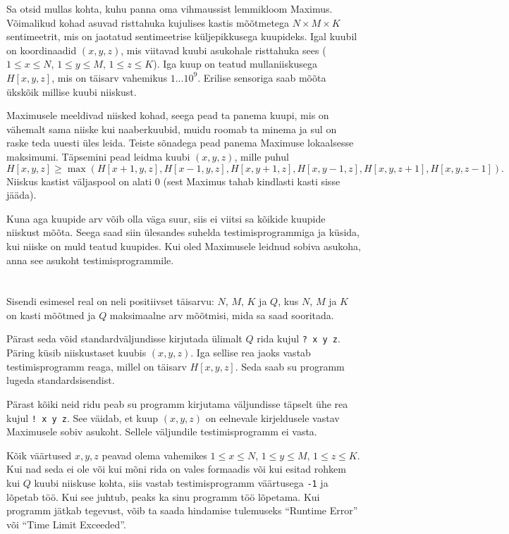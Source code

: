 \ifx\boi\undefined\fi
\def\version{jury-1}

Sa otsid mullas kohta, kuhu panna oma vihmaussist lemmikloom Maximus. 
Võimalikud kohad asuvad risttahuka kujulises kastis mõõtmetega $N \times M \times K$ sentimeetrit, 
mis on jaotatud sentimeetrise küljepikkusega kuupideks. Igal kuubil on koordinaadid $(x,y,z)$, 
mis viitavad kuubi asukohale risttahuka sees ($1 \le x \le N$, $1 \le y \le M$, $1 \le z \le K$). 
Iga kuup on teatud mullaniiskusega $H[x,y,z]$, mis on täisarv vahemikus $1 \dots 10^9$. 
Erilise sensoriga saab mõõta ükskõik millise kuubi niiskust.

Maximusele meeldivad niisked kohad, seega pead ta panema kuupi, mis on vähemalt sama niiske kui naaberkuubid, 
muidu roomab ta minema ja sul on raske teda uuesti üles leida.
Teiste sõnadega pead panema Maximuse lokaalsesse maksimumi.
Täpsemini pead leidma kuubi $(x,y,z)$, mille puhul
$$
H[x,y,z] \ge \max(H[x+1,y,z], H[x-1,y,z], H[x,y+1,z], H[x,y-1,z], H[x,y,z+1], H[x,y,z-1]).
$$
Niiskus kastist väljaspool on alati $0$ (sest Maximus tahab kindlasti kasti sisse jääda).

Kuna aga kuupide arv võib olla väga suur, siis ei viitsi sa kõikide kuupide niiskust mõõta. Seega saad siin ülesandes suhelda testimisprogrammiga ja küsida, kui niiske on muld teatud kuupides.
Kui oled Maximusele leidnud sobiva asukoha, anna see asukoht testimisprogrammile.

\section*{\interactivity}
Sisendi esimesel real on neli positiivset täisarvu: $N$, $M$, $K$ ja $Q$, kus $N$, $M$ ja $K$ on kasti mõõtmed ja $Q$ maksimaalne arv mõõtmisi, mida sa saad sooritada.

Pärast seda võid standardväljundisse kirjutada ülimalt $Q$ rida kujul \texttt{?\ x y z}.
Päring küsib niiskustaset kuubis $(x, y, z)$.
Iga sellise rea jaoks vastab testimisprogramm reaga, millel on täisarv $H[x,y,z]$. Seda saab su programm lugeda standardsisendist.

Pärast kõiki neid ridu peab su programm kirjutama väljundisse täpselt ühe rea kujul \texttt{!\ x y z}.
See väidab, et kuup $(x, y, z)$ on eelnevale kirjeldusele vastav Maximusele sobiv asukoht.
Sellele väljundile testimisprogramm ei vasta.

Kõik väärtused $x, y, z$ peavad olema vahemikes $1 \le x \le N$, $1 \le y \le M$, $1 \le z \le K$.
Kui nad seda ei ole või kui mõni rida on vales formaadis või kui esitad rohkem kui $Q$ kuubi niiskuse kohta,
siis vastab testimisprogramm väärtusega \texttt{-1} ja lõpetab töö.
Kui see juhtub, peaks ka sinu programm töö lõpetama. Kui programm jätkab tegevust, võib ta 
saada hindamise tulemuseks ``Runtime Error'' või ``Time Limit Exceeded''.

